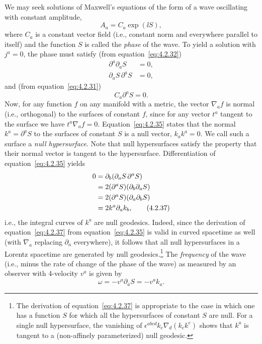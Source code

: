 We may seek solutions of Maxwell's equations of the form of a wave oscillating
with constant amplitude,
\begin{equation}
  A_a=C_a\exp(\ii S) ,
  \tag{4.2.33}\label{eq:4.2.33}
\end{equation}
where \(C_a\) is a constant vector field (i.e., constant norm and everywhere
parallel to itself) and the function \(S\) is called the \emph{phase} of the wave.
To yield a solution with \(j^a=0\), the phase must satisfy (from
equation~\eqref{eq:4.2.32})
\begin{align}
  \partial^a\partial_aS&=0 ,
    \tag{4.2.34}\label{eq:4.2.34}\\
  \partial_aS\,\partial^aS&=0 ,
    \tag{4.2.35}\label{eq:4.2.35}
\end{align}
and (from equation~\eqref{eq:4.2.31})
\begin{equation}
  C_a\partial^aS=0 .
  \tag{4.2.36}\label{eq:4.2.36}
\end{equation}
Now, for any function \(f\) on any manifold with a metric, the vector
\(\nabla_af\) is normal (i.e., orthogonal) to the surfaces of constant \(f\),
since for any vector \(t^a\) tangent to the surface we have
\(t^a\nabla_af=0\). Equation~\eqref{eq:4.2.35} states that the normal
\(k^a=\partial^aS\) to the surfaces of constant \(S\) is a null vector,
\(k_ak^a=0\). We call such a surface a \emph{null hypersurface}. Note that
null hypersurfaces satisfy the property that their normal vector is tangent to the
hypersurface. Differentiation of equation~\eqref{eq:4.2.35} yields
\begin{align}
  0&=\partial_b(\partial_aS\,\partial^aS)\notag\\
   &=2(\partial^aS)(\partial_b\partial_aS)\notag\\
   &=2(\partial^aS)(\partial_a\partial_bS)\notag\\
   &=2k^a\partial_ak_b ,
  \tag{4.2.37}\label{eq:4.2.37}
\end{align}
i.e., the integral curves of \(k^a\) are null geodesics. Indeed, since the
derivation of equation~\eqref{eq:4.2.37} from
equation~\eqref{eq:4.2.35} is valid in curved spacetime as well (with
\(\nabla_a\) replacing \(\partial_a\) everywhere), it follows that all null
hypersurfaces in a Lorentz spacetime are generated by null geodesics.\footnote{The
derivation of equation~\eqref{eq:4.2.37} is appropriate to the case in which
one has a function \(S\) for which all the hypersurfaces of constant \(S\) are
null. For a single null hypersurface, the vanishing of
\(\epsilon^{abcd}k_c\nabla_d(k_ek^e)\) shows that \(k^a\) is tangent to a
(non-affinely parameterized) null geodesic.} The \emph{frequency} of the wave
(i.e., minus the rate of change of the phase of the wave) as measured by an
observer with 4-velocity \(v^a\) is given by
\begin{equation}
  \omega=-v^a\partial_aS=-v^ak_a .
  \tag{4.2.38}\label{eq:4.2.38}
\end{equation}


